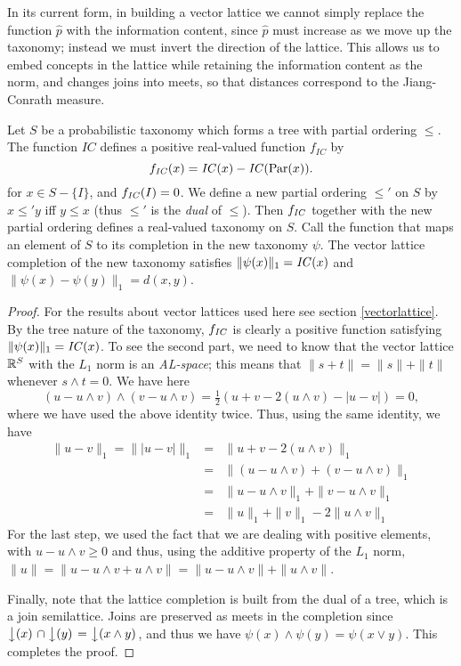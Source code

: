 \documentclass{report}
\begin{document}
In its current form, in building a vector lattice we cannot simply replace the function $\hat{p}$ with the information content, since $\hat{p}$ must increase as we move up the taxonomy; instead we must invert the direction of the lattice. This allows us to embed concepts in the lattice while retaining the information content as the norm, and changes joins into meets, so that distances correspond to the Jiang-Conrath measure.
\begin{prop}
Let $S$ be a probabilistic taxonomy which forms a tree with partial ordering $\le$. The function $\mathit{IC}$ defines a positive real-valued function $f_\mathit{IC}$ by
$$f_{\mathit{IC}}(x) = \mathit{IC}(x) - \mathit{IC}(\mathrm{Par}(x)).$$
for $x \in S - \{I\}$, and $f_{\mathit{IC}}(I) = 0$. We define a new partial ordering $\le'$ on $S$ by $x \le' y$ iff $y \le x$ (thus $\le'$ is the \emph{dual} of $\le$). Then $f_{\mathit{IC}}$ together with the new partial ordering defines a real-valued taxonomy on $S$. Call the function that maps an element of $S$ to its completion in the new taxonomy $\psi$. The vector lattice completion of the new taxonomy satisfies $\|\psi(x)\|_1 = \mathit{IC}(x)$ and $\|\psi(x) - \psi(y)\|_1 = d(x,y)$. 
\end{prop}

\begin{proof}
For the results about vector lattices used here see section \ref{vectorlattice}. By the tree nature of the taxonomy, $f_{\mathit{IC}}$ is clearly a positive function satisfying $\|\psi(x)\|_1 = \mathit{IC}(x)$. To see the second part, we need to know that the vector lattice $\mathbb{R}^S$ with the $L_1$ norm is an \emph{AL-space}; this means that $\|s + t\| = \|s\| + \|t\|$ whenever $s \land t = 0$. We have here
$$(u - u\land v)\land (v - u\land v)  = \tfrac{1}{2}(u + v - 2(u\land v) - |u - v|) = 0,$$
where we have used the above identity twice. Thus, using the same identity, we have
\begin{eqnarray*}
 \|u - v\|_1 = \| |u - v| \|_1&=& \|u + v - 2(u \land v)\|_1\\
		&=& \|(u - u\land v) + (v - u \land v)\|_1\\
		&=& \|u - u\land v \|_1 + \|v - u \land v \|_1\\
		&=& \|u\|_1 + \|v\|_1 -2\|u\land v\|_1
\end{eqnarray*}
For the last step, we used the fact that we are dealing with positive elements, with $u - u\land v \ge 0$ and thus, using the additive property of the $L_1$ norm, $\|u\| = \|u - u\land v + u\land v\| = \|u - u\land v\| + \|u\land v\|$.

Finally, note that the lattice completion is built from the dual of a tree, which is a join semilattice. Joins are preserved as meets in the completion since $\left\downarrow(x)\right. \cap \left\downarrow(y)\right. = \left\downarrow(x \land y)\right.$, and thus we have $\psi(x) \land \psi(y) = \psi(x\lor y)$. This completes the proof.
\end{proof}
\end{document}
